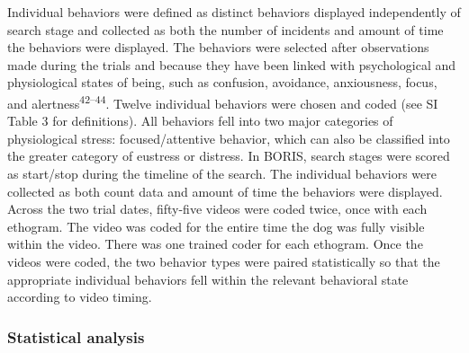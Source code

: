 \documentclass[
]{article}
\begin{document}
Individual behaviors were defined as distinct behaviors displayed independently of search stage and collected as both the number of incidents and amount of time the behaviors were displayed. The behaviors were selected after observations made during the trials and because they have been linked with psychological and physiological states of being, such as confusion, avoidance, anxiousness, focus, and alertness\textsuperscript{42--44}. Twelve individual behaviors were chosen and coded (see SI Table 3 for definitions). All behaviors fell into two major categories of physiological stress: focused/attentive behavior, which can also be classified into the greater category of eustress or distress. In BORIS, search stages were scored as start/stop during the timeline of the search. The individual behaviors were collected as both count data and amount of time the behaviors were displayed. Across the two trial dates, fifty-five videos were coded twice, once with each ethogram. The video was coded for the entire time the dog was fully visible within the video. There was one trained coder for each ethogram. Once the videos were coded, the two behavior types were paired statistically so that the appropriate individual behaviors fell within the relevant behavioral state according to video timing.

\hypertarget{statistical-analysis}{%
\subsubsection{Statistical analysis}\label{statistical-analysis}}
\end{document}
